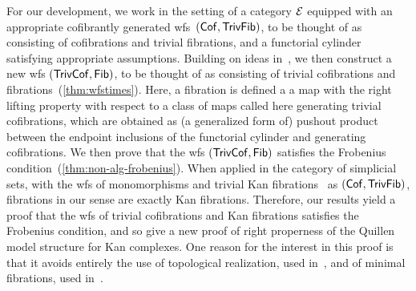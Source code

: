 \documentclass[reqno,10pt,a4paper,oneside,draft]{amsart}
\begin{document}
For our development, we work in the setting of a category $\cal{E}$ equipped with an appropriate cofibrantly
generated wfs~$(\Cof, \TrivFib)$, to be thought of as consisting of cofibrations and trivial fibrations, and a functorial cylinder satisfying appropriate assumptions.
Building on ideas in~\cite{cisinski-asterisque}, we then construct a new wfs $(\TrivCof, \Fib)$, to be thought of as consisting of  trivial cofibrations and fibrations~(\cref{thm:wfstimes}). Here, a fibration is defined a a map with the right lifting property with respect to a class of maps called here generating trivial cofibrations, which are obtained as (a generalized form of) pushout product between the endpoint inclusions of the functorial cylinder and generating 
cofibrations.  We then prove that the wfs $(\TrivCof, \Fib)$ satisfies the Frobenius condition~(\cref{thm:non-alg-frobenius}).
When applied in the category of simplicial sets, with the wfs of monomorphisms and trivial Kan fibrations~\cite{quillen-homotopical} as $(\Cof, \TrivFib)$, fibrations in our sense are exactly Kan fibrations.
Therefore, our results yield a proof that the wfs of trivial cofibrations and Kan fibrations satisfies the Frobenius condition, and so give a new proof of right properness of the Quillen model structure for Kan complexes.
One reason for the interest in this proof is that it avoids entirely the use of topological realization, used in~\cite{hovey-model-categories}, and of minimal fibrations, used in~\cite{joyal-tierney:simplicial-homotopy-theory}.
\end{document}
